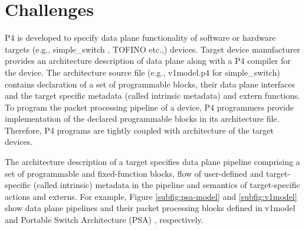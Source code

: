 \documentclass{hotnets19}
\begin{document}



\section{Challenges}
P4 is developed to specify data plane functionality of software or hardware targets (e.g., simple\_\-switch \cite{simple_switch.md}, TOFINO \cite{tofino} etc.,) devices.
Target device manufacturer provides an architecture description of data plane along with a P4 compiler for the device.
The architecture source file (e.g., v1\-mod\-el\-.p4 \cite{v1model.p4} for simple\_switch) contains declaration of a set of pro\-gram\-ma\-ble blocks, their data plane interfaces and the target specific metadata (called intrinsic metadata) and extern functions.
To program the packet processing pipeline of a device, P4 programmers provide implementation of the declared programmable blocks in its architecture file.
Therefore, P4 programs are tightly coupled with architecture of the target devices.


The architecture description of a target specifies data plane pipeline comprising a set of pro\-gram\-ma\-ble and fixed-function blocks, flow of user-defined and target-specific (called intrinsic) metadata in the pipeline and semantics of target-specific actions and externs.
For example, Figure \ref{subfig:psa-model} and \ref{subfig:v1model} show data plane pipelines and their packet processing blocks defined in v1model \cite{simple_switch.md} and Portable Switch Architecture (PSA) \cite{psa}, respectively.
\end{document}
